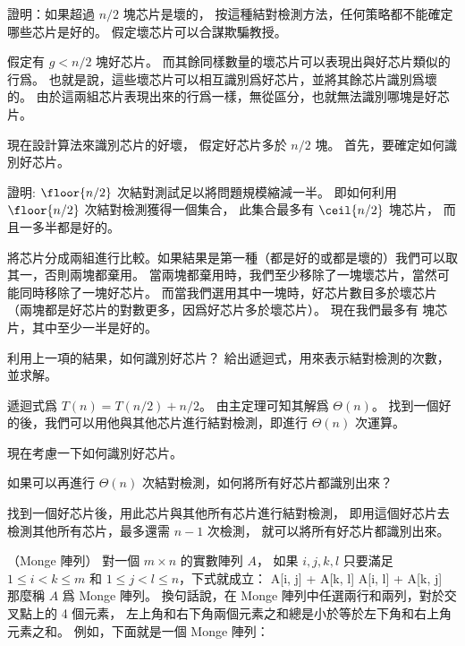 \startigBase[a]
\item 證明：如果超過 $n/2$ 塊芯片是壞的，
按這種結對檢測方法，任何策略都不能確定哪些芯片是好的。
假定壞芯片可以合謀欺騙教授。

\startANSWER
假定有 $g < n/2$ 塊好芯片。
而其餘同樣數量的壞芯片可以表現出與好芯片類似的行爲。
也就是說，這些壞芯片可以相互識別爲好芯片，並將其餘芯片識別爲壞的。
由於這兩組芯片表現出來的行爲一樣，無從區分，也就無法識別哪塊是好芯片。
\stopANSWER

現在設計算法來識別芯片的好壞，
假定好芯片多於 $n/2$ 塊。
首先，要確定如何識別好芯片。

\item 證明:
$\floor{n/2}$ 次結對測試足以將問題規模縮減一半。
即如何利用 $\floor{n/2}$ 次結對檢測獲得一個集合，
此集合最多有 $\ceil{n/2}$ 塊芯片，
而且一多半都是好的。

\startANSWER
將芯片分成兩組進行比較。如果結果是第一種（都是好的或都是壞的）我們可以取其一，否則兩塊都棄用。
當兩塊都棄用時，我們至少移除了一塊壞芯片，當然可能同時移除了一塊好芯片。
而當我們選用其中一塊時，好芯片數目多於壞芯片（兩塊都是好芯片的對數更多，因爲好芯片多於壞芯片）。
現在我們最多有  塊芯片，其中至少一半是好的。
\stopANSWER

\item 利用上一項的結果，如何識別好芯片？
給出遞迴式，用來表示結對檢測的次數，並求解。

\startANSWER
遞迴式爲 $T(n) = T(n/2) + n/2$。
由主定理可知其解爲 $\Theta(n)$。
找到一個好的後，我們可以用他與其他芯片進行結對檢測，即進行 $\Theta(n)$ 次運算。
\stopANSWER

現在考慮一下如何識別好芯片。

\startitem
如果可以再進行 $\Theta(n)$ 次結對檢測，如何將所有好芯片都識別出來？
\stopitem

\startANSWER
找到一個好芯片後，用此芯片與其他所有芯片進行結對檢測，
即用這個好芯片去檢測其他所有芯片，最多還需 $n-1$ 次檢測，
就可以將所有好芯片都識別出來。
\stopANSWER

\stopigBase
\stopPROBLEM

\startPROBLEM（Monge 陣列）
對一個 $m\times n$ 的實數陣列 $A$，
如果 $i,j,k,l$ 只要滿足 $1\le i < k \le m$ 和 $1\le j < l \le n$，下式就成立：
\startformula
A[i, j] + A[k, l] \le A[i, l] + A[k, j]
\stopformula
那麼稱 $A$ 爲 {\EMP Monge 陣列}。
換句話說，在 Monge 陣列中任選兩行和兩列，對於交叉點上的 4 個元素，
左上角和右下角兩個元素之和總是小於等於左下角和右上角元素之和。
例如，下面就是一個 Monge 陣列：
\startformula\startmatrix
{}     \NR
{}     \NR
{}     \NR
{}     \NR
{}     \NR
{}     \NR
{}     \NR
\stopmatrix\stopformula

